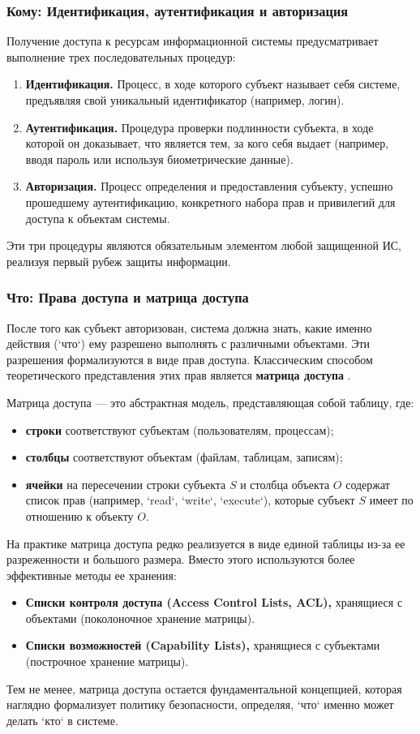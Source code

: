 \subsubsection{Кому: Идентификация, аутентификация и авторизация}
Получение доступа к ресурсам информационной системы предусматривает выполнение трех последовательных процедур:
\begin{enumerate}
	\item \textbf{Идентификация.} Процесс, в ходе которого субъект называет себя системе, предъявляя свой уникальный идентификатор (например, логин).
	\item \textbf{Аутентификация.} Процедура проверки подлинности субъекта, в ходе которой он доказывает, что является тем, за кого себя выдает (например, вводя пароль или используя биометрические данные).
	\item \textbf{Авторизация.} Процесс определения и предоставления субъекту, успешно прошедшему аутентификацию, конкретного набора прав и привилегий для доступа к объектам системы.
\end{enumerate}
Эти три процедуры являются обязательным элементом любой защищенной ИС, реализуя первый рубеж защиты информации.

\subsubsection{Что: Права доступа и матрица доступа}
После того как субъект авторизован, система должна знать, какие именно действия (`что`) ему разрешено выполнять с различными объектами. Эти разрешения формализуются в виде прав доступа. Классическим способом теоретического представления этих прав является \textbf{матрица доступа} \autocite{Tanenbaum}.

Матрица доступа — это абстрактная модель, представляющая собой таблицу, где:
\begin{itemize}
    \item \textbf{строки} соответствуют субъектам (пользователям, процессам);
    \item \textbf{столбцы} соответствуют объектам (файлам, таблицам, записям);
    \item \textbf{ячейки} на пересечении строки субъекта $S$ и столбца объекта $O$ содержат список прав (например, `read`, `write`, `execute`), которые субъект $S$ имеет по отношению к объекту $O$.
\end{itemize}

На практике матрица доступа редко реализуется в виде единой таблицы из-за ее разреженности и большого размера. Вместо этого используются более эффективные методы ее хранения:
\begin{itemize}
    \item \textbf{Списки контроля доступа (Access Control Lists, ACL),} хранящиеся с объектами (поколоночное хранение матрицы).
    \item \textbf{Списки возможностей (Capability Lists),} хранящиеся с субъектами (построчное хранение матрицы).
\end{itemize}
Тем не менее, матрица доступа остается фундаментальной концепцией, которая наглядно формализует политику безопасности, определяя, `что` именно может делать `кто` в системе.

\clearpage
